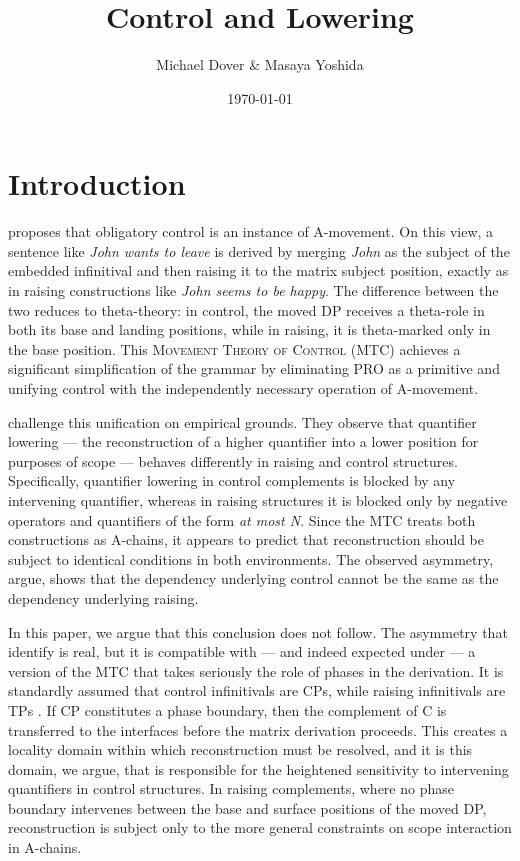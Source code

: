 \documentclass[12pt]{article}
\title{Control and Lowering}
\author{Michael Dover \& Masaya Yoshida}
\date{\today}
\begin{document}
\maketitle

\section{Introduction}\label{sec:intro}

\citet{hornstein1999} proposes that obligatory control is an instance of A-movement. On this view, a sentence like \emph{John wants to leave} is derived by merging \emph{John} as the subject of the embedded infinitival and then raising it to the matrix subject position, exactly as in raising constructions like \emph{John seems to be happy}. The difference between the two reduces to theta-theory: in control, the moved DP receives a theta-role in both its base and landing positions, while in raising, it is theta-marked only in the base position. This \textsc{Movement Theory of Control} (MTC) achieves a significant simplification of the grammar by eliminating PRO as a primitive and unifying control with the independently necessary operation of A-movement.

\citet{neeleman2006} challenge this unification on empirical grounds. They observe that quantifier lowering --- the reconstruction of a higher quantifier into a lower position for purposes of scope --- behaves differently in raising and control structures. Specifically, quantifier lowering in control complements is blocked by any intervening quantifier, whereas in raising structures it is blocked only by negative operators and quantifiers of the form \emph{at most N}. Since the MTC treats both constructions as A-chains, it appears to predict that reconstruction should be subject to identical conditions in both environments. The observed asymmetry, \citeauthor{neeleman2006} argue, shows that the dependency underlying control cannot be the same as the dependency underlying raising.

In this paper, we argue that this conclusion does not follow. The asymmetry that \citeauthor{neeleman2006} identify is real, but it is compatible with --- and indeed expected under --- a version of the MTC that takes seriously the role of phases in the derivation. It is standardly assumed that control infinitivals are CPs, while raising infinitivals are TPs \citep{chomsky2001}. If CP constitutes a phase boundary, then the complement of C is transferred to the interfaces before the matrix derivation proceeds. This creates a locality domain within which reconstruction must be resolved, and it is this domain, we argue, that is responsible for the heightened sensitivity to intervening quantifiers in control structures. In raising complements, where no phase boundary intervenes between the base and surface positions of the moved DP, reconstruction is subject only to the more general constraints on scope interaction in A-chains.
\end{document}

